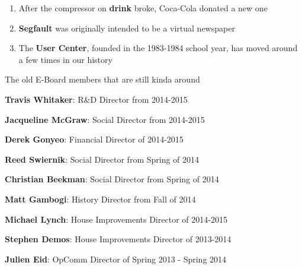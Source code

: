 \documentclass[9pt]{extarticle}
\begin{document}
\begin{minipage}[t]{.61\linewidth}

\hypertarget{secondnews}{} 

\begin{enumerate}
\item After the compressor on \textbf{drink} broke, Coca-Cola donated 
	a new one
\\
\item \textbf{Segfault} was originally intended to be a virtual newspaper
\\
\item The \textbf{User Center}, founded in the 1983-1984 school year,
	has moved around a few times in our history
\end{enumerate}

\hypertarget{thirdnews}{} 

\centerline{The old E-Board members that are still kinda around} 
\centerline{}
\centerline{\textbf{Travis Whitaker}: R\&D Director from 2014-2015} 
\centerline{\textbf{Jacqueline McGraw}: Social Director from 2014-2015}
\centerline{\textbf{Derek Gonyeo}: Financial Director of 2014-2015} 
\centerline{\textbf{Reed Swiernik}: Social Director from Spring of 2014} 
\centerline{\textbf{Christian Beekman}: Social Director from Spring of 2014} 
\centerline{\textbf{Matt Gambogi}: History Director from Fall of 2014}
\centerline{\textbf{Michael Lynch}: House Improvements Director of
 2014-2015}
\centerline{\textbf{Stephen Demos}: House Improvements Director of 
2013-2014}
\centerline{\textbf{Julien Eid}: OpComm Director of Spring 2013 - Spring 2014}

\end{minipage} %
\end{document}
